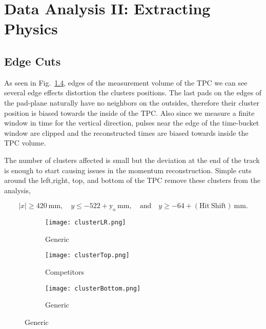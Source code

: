 \chapter{Data Analysis II: Extracting Physics}

\section{Edge Cuts}
As seen in Fig.~\ref{fig:edge}, edges of the measurement volume of the TPC we can see several edge effects distortion the clusters positions. The last pads on the edges of the pad-plane naturally have no neighbors on the outsides, therefore their cluster position is biased towards the inside of the TPC. Also since we measure a finite window in time for the vertical direction, pulses near the edge of the time-bucket window are clipped and the reconstructed times are biased towards inside the TPC volume. 

The number of clusters affected is small but the deviation at the end of the track is enough to start causing issues in the momentum reconstruction. Simple cuts around the left,right, top, and bottom of the TPC remove these clusters from the analysis,

\begin{equation*}
  |x|\geq420~\mathrm{mm},\quad y\leq-522+\mathrm{y_o}~\mathrm{mm},
  \quad\mathrm{and}\quad y\geq-64+\mathrm{(Hit\ Shift)}~\mathrm{mm}.
  \label{eq:hitshift}
\end{equation*}

\begin{figure}[!htb]
    \centering
    \begin{subfigure}[t]{0.45\textwidth}
        \centering
        \texttt{[image: clusterLR.png]} 
        \caption{Generic} \label{fig:mom_S_before}
    \end{subfigure}
    \hfill
    \begin{subfigure}[t]{0.45\textwidth}
        \centering
        \texttt{[image: clusterTop.png]} 
        \caption{Competitors} \label{fig:mom_L_before}
    \end{subfigure}
    
    \begin{subfigure}[t]{0.45\textwidth}
        \centering
        \texttt{[image: clusterBottom.png]} 
        \caption{Generic} \label{fig:mom_S_after}
    \end{subfigure}
   
\label{fig:edge}
\end{figure}

